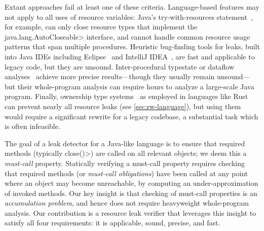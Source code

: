 \noindent
Extant approaches fail at least one of these criteria.
Language-based features may not apply to all uses of resource variables:
Java's try-with-resources statement~\cite{try-with-resources}, for example, can
only close resource types that implement the \<java.lang.AutoCloseable> interface,
and cannot handle
common resource usage patterns that span multiple procedures. 
Heuristic bug-finding tools for leaks, built into Java IDEs including
Eclipse~\cite{ecj-resource-leak} and IntelliJ
IDEA~\cite{idea-resource-leak}, 
are fast and applicable to legacy
code, but they are unsound.
Inter-procedural typestate or dataflow analyses~\cite{TorlakC10,zuo2019grapple}
achieve more precise
results---though they usually remain unsound---but
their whole-program analysis can require hours to analyze a large-scale Java program.
Finally, ownership type
systems~\cite{clarke2013ownership} as employed in languages like
Rust~\cite{klabnik2018rust} can prevent nearly all resource leaks (see
\cref{sec:rw-language}), but using them would require a significant rewrite for
a legacy codebase, a substantial task which is often infeasible.

The goal of a leak detector for a Java-like language is to ensure that required
methods (typically \<close()>) are called on all relevant objects; we deem this
a \emph{must-call} property.  Statically verifying a must-call property requires
checking that required methods (or \emph{must-call obligations}) have been
called at any point where an object may become unreachable, by computing an
under-approximation of invoked methods.  Our key insight is that checking of
must-call properties is an \emph{accumulation problem}, and hence does not
require heavyweight whole-program analysis. Our contribution is a resource leak
verifier that leverages this insight to satisfy all four requirements: it is
applicable, sound, precise, and fast.

